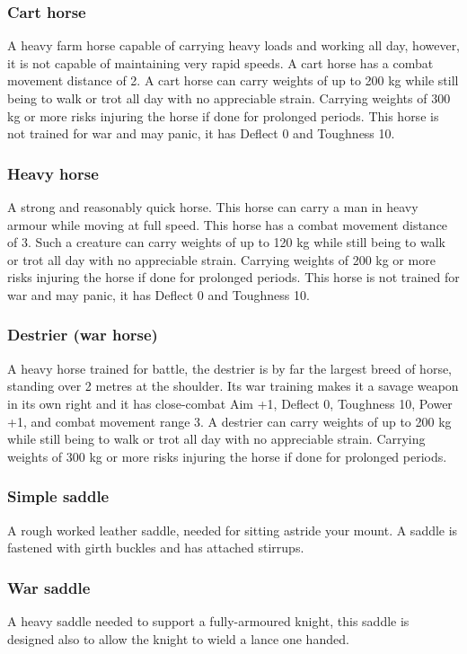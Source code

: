 \documentclass[a4paper,11pt,oneside]{book}
\begin{document}
\subsubsection{Cart horse}
A heavy farm horse capable of carrying heavy loads and working all day, however, it is not capable of maintaining very rapid speeds. A cart horse has a combat movement distance of 2. A cart horse can carry weights of up to 200 kg while still being to walk or trot all day with no appreciable strain. Carrying weights of 300 kg or more risks injuring the horse if done for prolonged periods. This horse is not trained for war and may panic, it has Deflect 0 and Toughness 10.

\subsubsection{Heavy horse}
A strong and reasonably quick horse. This horse can carry a man in heavy armour while moving at full speed. This horse has a combat movement distance of 3. Such a creature can carry weights of up to 120 kg while still being to walk or trot all day with no appreciable strain. Carrying weights of 200 kg or more risks injuring the horse if done for prolonged periods. This horse is not trained for war and may panic, it has Deflect 0 and Toughness 10.

\subsubsection{Destrier (war horse)}
A heavy horse trained for battle, the destrier is by far the largest breed of horse, standing over 2 metres at the shoulder. Its war training makes it a savage weapon in its own right and it has close-combat Aim +1, Deflect 0, Toughness 10, Power +1, and combat movement range 3. A destrier can carry weights of up to 200 kg while still being to walk or trot all day with no appreciable strain. Carrying weights of 300 kg or more risks injuring the horse if done for prolonged periods.

\subsubsection{Simple saddle}
A rough worked leather saddle, needed for sitting astride your mount. A saddle is fastened with girth buckles and has attached stirrups.

\subsubsection{War saddle}
A heavy saddle needed to support a fully-armoured knight, this saddle is designed also to allow the knight to wield a lance one handed.
\end{document}
